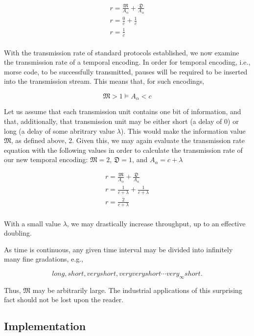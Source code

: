 \documentclass[sigplan]{acmart}
\begin{document}
\begin{eqnarray*}
    r = \frac{\mathfrak{M}}{A_\alpha} + \frac{\mathfrak{D}}{A_\alpha} \\
    r = \frac{0}{c} + \frac{1}{c} \\
    r = \frac{1}{c} \\
\end{eqnarray*}

With the transmission rate of standard protocols established,
we now examine the transmission rate of a temporal encoding.
In order for temporal encoding, i.e., morse code, to be successfully transmitted,
pauses will be required to be inserted into the transmission stream.
This means that, for such encodings,

\[
    \mathfrak{M} > 1 \models A_\alpha < c
\]

Let us assume that each transmission unit contains one bit of information,
and that, additionally, that transmission unit may be either short (a delay
of 0) or long (a delay of some abritrary value $\lambda$). This would
make the information value $\mathfrak{M}$, as defined above, 2.
Given this, we may again evaluate the transmission rate equation
with the following values in order to calculate the transmission
rate of our new temporal encoding:
$\mathfrak{M} = 2$, $\mathfrak{D} = 1$, and $A_\alpha = c + \lambda$

\begin{eqnarray*}
    r = \frac{\mathfrak{M}}{A_\alpha} + \frac{\mathfrak{D}}{A_\alpha} \\
    r = \frac{1}{c + \lambda} + \frac{1}{c + \lambda} \\
    r = \frac{2}{c + \lambda} \\
\end{eqnarray*}

With a small value $\lambda$, we may drastically increase throughput, up to
an effective doubling.

As time is continuous,
any given time interval may be divided into infinitely many fine
gradations, e.g.,
    
\[
    long, short, very short, very very short \cdots very_\infty short.
\]

Thus, $\mathfrak{M}$ may be arbitrarily large. The industrial
applications of this surprising fact should not be lost upon
the reader.

\subsection{Implementation}
\end{document}
